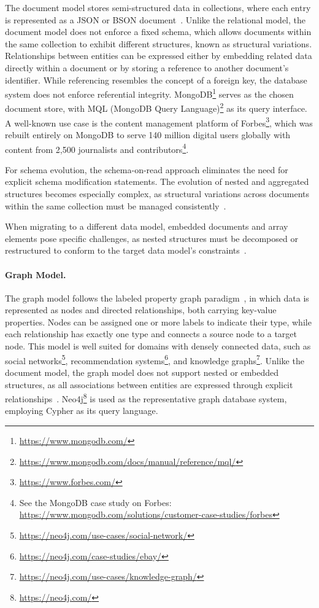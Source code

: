 The document model stores semi-structured data in collections, where each
entry is represented as a JSON or BSON document~\cite{chodorow2013mongodb}.
Unlike the relational model, the document model does not enforce a fixed
schema, which allows documents within the same collection to exhibit
different structures, known as structural
variations. Relationships between entities
can be expressed either by embedding related data directly within a document
or by storing a reference to another document's identifier. While
referencing resembles the concept of a foreign key, the database system does
not enforce referential integrity. MongoDB\footnote{\url{https://www.mongodb.com/}} serves as the chosen document store, with MQL
(MongoDB Query Language)\footnote{\url{https://www.mongodb.com/docs/manual/reference/mql/}}
as its query interface. A well-known use case is the content management platform of
Forbes\footnote{\url{https://www.forbes.com/}}, which was rebuilt
entirely on MongoDB to serve 140 million digital users globally
with content from 2,500 journalists and
contributors\footnote{See the MongoDB case study on Forbes:
\url{https://www.mongodb.com/solutions/customer-case-studies/forbes}}.

For schema evolution, the schema-on-read approach eliminates the need
for explicit schema modification statements.
The evolution of nested and aggregated structures becomes especially
complex, as structural variations across documents within the same
collection must be managed
consistently~\cite{scherzinger2020empirical}.

When migrating to a different data model, embedded documents and array
elements pose specific challenges, as nested structures must be decomposed
or restructured to conform to the target data model's
constraints~\cite{kuszera2022exploring}.


\paragraph{Graph Model.}\quad

The graph model follows the labeled property graph
paradigm~\cite{robinson2015graph}, in which data is represented as nodes
and directed relationships, both carrying key-value properties. Nodes can
be assigned one or more labels to indicate their type, while each
relationship has exactly one type and connects a source node to a target
node. This model is well suited for domains with densely connected
data, such as social
networks\footnote{\url{https://neo4j.com/use-cases/social-network/}},
recommendation
systems\footnote{\url{https://neo4j.com/case-studies/ebay/}}, and
knowledge
graphs\footnote{\url{https://neo4j.com/use-cases/knowledge-graph/}}. Unlike the document model, the graph model does not support nested
or embedded structures, as all associations between entities are
expressed through explicit relationships~\cite{robinson2015graph}.
Neo4j\footnote{\url{https://neo4j.com/}} is used as the representative
graph database system, employing Cypher as its query language.

